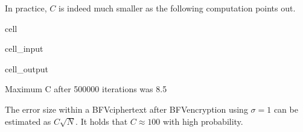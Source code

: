 \documentclass[letterpaper,10pt,english]{jupyterBook}
\begin{document}
\sphinxAtStartPar
In practice, \(C\) is indeed much smaller as the following computation points out.

\begin{sphinxuseclass}{cell}\begin{sphinxVerbatimInput}

\begin{sphinxuseclass}{cell_input}
\begin{sphinxVerbatim}[commandchars=\\\{\}]
      
   
      \PYG{p}{[}      \PYG{p}{]}
      
      \PYG{p}{[}\PYG{p}{]}\PYG{p}{[}\PYG{p}{]}\PYG{p}{[}\PYG{p}{]}\PYG{p}{[}\PYG{p}{]} 
\end{sphinxVerbatim}

\end{sphinxuseclass}\end{sphinxVerbatimInput}
\begin{sphinxVerbatimOutput}

\begin{sphinxuseclass}{cell_output}
\begin{sphinxVerbatim}[commandchars=\\\{\}]
Maximum C after 500000 iterations was 8.5
\end{sphinxVerbatim}

\end{sphinxuseclass}\end{sphinxVerbatimOutput}

\end{sphinxuseclass}
\sphinxAtStartPar
The error size within a BFV\sphinxhyphen{}ciphertext after BFV\sphinxhyphen{}encryption using \(\sigma = 1\) can be estimated as \(C\sqrt{N}\). It holds that \(C \approx 100\) with high probability.
\end{document}
